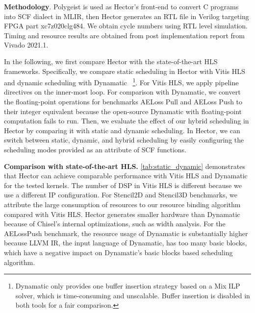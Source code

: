 \textbf{Methodology}. Polygeist\cite{polygeist} is used as Hector's front-end to convert C programs into SCF dialect in MLIR, then Hector generates an RTL file in Verilog targeting FPGA part xc7z020clg484. We obtain cycle numbers using RTL level simulation. Timing and resource results are obtained from post implementation report from Vivado 2021.1.

In the following, we first compare Hector with the state-of-the-art HLS frameworks. Specifically, we compare static scheduling in Hector with Vitis HLS~\cite{VivadoHls} and dynamic scheduling with Dynamatic~\cite{Dynamatic_Josipovi} \footnote{Dynamatic only provides one buffer insertion strategy based on a Mix ILP solver, which is time-consuming and unscalable. Buffer insertion is disabled in both tools for a fair comparison.}. For Vitis HLS, we apply pipeline directives on the inner-most loop. For comparison with Dynamatic, we convert the floating-point operations for benchmarks AELoss Pull and AELoss Push to their integer equivalent because the open-source Dynamatic with floating-point computation fails to run. Then, we evaluate the effect of our hybrid scheduling in Hector by comparing it with static and dynamic scheduling. In Hector, we can switch between static, dynamic, and hybrid scheduling by easily configuring the scheduling modes provided as an attribute of SCF functions.

\textbf{Comparison with state-of-the-art HLS.} \autoref{tab:static_dynamic} demonstrates that Hector can achieve comparable performance with Vitis HLS and Dynamatic for the tested kernels. The number of DSP in Vitis HLS is different because we use a different IP configuration. For Stencil2D and Stencil3D benchmarks, we attribute the large consumption of resources to our resource binding algorithm compared with Vitis HLS. Hector generates smaller hardware than Dynamatic because of Chisel's internal optimizations, such as width analysis. For the AELossPush benchmark, the resource usage of Dynamatic is substantially higher because LLVM IR, the input language of Dynamatic, has too many basic blocks, which have a negative impact on Dynamatic's basic blocks based scheduling algorithm.


